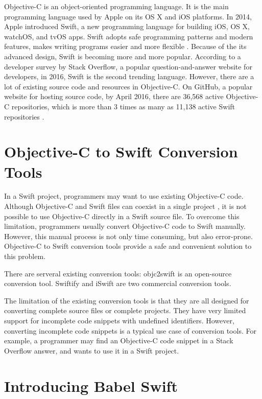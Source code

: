\documentclass{sfuthesis}
\begin{document}
Objective-C is an object-oriented programming language. It is the main programming language used by Apple on its OS X and iOS platforms. In 2014, Apple introduced Swift, a new programming language for building iOS, OS X, watchOS, and tvOS apps. Swift adopts safe programming patterns and modern features, makes writing programs easier and more flexible \cite{aboutswift}. Because of the its advanced design, Swift is becoming more and more popular. According to a developer survey by Stack Overflow, a popular question-and-answer website for developers, in 2016, Swift is the second trending language. However, there are a lot of existing source code and resources in Objective-C. On GitHub, a popular website for hosting source code, by April 2016, there are 36,568 active Objective-C repositories, which is more than 3 times as many as 11,138 active Swift repositories \cite{githut}.

\section{Objective-C to Swift Conversion Tools}

In a Swift project, programmers may want to use existing Objective-C code. Although Objective-C and Swift files can coexist in a single project \cite{swiftandobjc}, it is not possible to use Objective-C directly in a Swift source file. To overcome this limitation, programmers usually convert Objective-C code to Swift manually. However, this manual process is not only time consuming, but also error-prone. Objective-C to Swift conversion tools provide a safe and convenient solution to this problem. 

There are serveral existing conversion tools: objc2swift \cite{objc2swift} is an open-source conversion tool. Swiftify \cite{swiftify} and iSwift \cite{iswift} are two commercial conversion tools.

The limitation of the existing conversion tools is that they are all designed for converting complete source files or complete projects. They have very limited support for incomplete code snippets with undefined identifiers. However, converting incomplete code snippets is a typical use case of conversion tools. For example, a programmer may find an Objective-C code snippet in a Stack Overflow answer, and wants to use it in a Swift project.

\section{Introducing Babel Swift}
\end{document}

